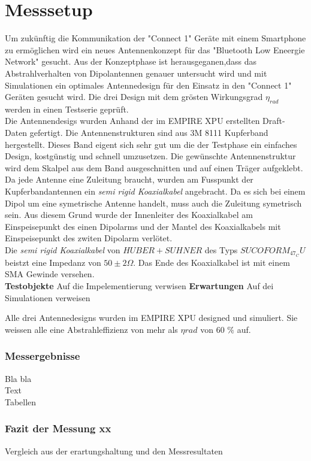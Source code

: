 \section{Messsetup}
Um zukünftig die Kommunikation der "Connect 1" Geräte mit einem Smartphone zu ermöglichen wird ein neues Antennenkonzept für das "Bluetooth Low Eneergie Network" gesucht. Aus der Konzeptphase ist herausgeganen,dass das Abstrahlverhalten von Dipolantennen genauer untersucht wird und mit Simulationen ein optimales Antennedesign für den Einsatz in den "Connect 1" Geräten gesucht wird. Die drei Design mit dem grösten Wirkungsgrad $\eta_{rad}$ werden in einen Testserie geprüft.\\
Die Antennendesigs wurden Anhand der im EMPIRE XPU erstellten Draft-Daten gefertigt. Die Antennenstrukturen sind aus 3M 8111 Kupferband hergestellt. Dieses Band eigent sich sehr gut um die der Testphase ein einfaches Design, kostgünstig und schnell umzusetzen. Die gewünschte Antennenstruktur wird dem Skalpel aus dem Band ausgeschnitten und auf einen Träger aufgeklebt. \\
Da jede Antenne eine Zuleitung braucht, wurden am Fusspunkt der Kupferbandantennen ein \textit{semi rigid Koaxialkabel} angebracht. Da es sich bei einem Dipol um eine symetrische Antenne handelt, muss auch die Zuleitung symetrisch sein. Aus diesem Grund wurde der Innenleiter des Koaxialkabel am Einspeisepunkt des einen Dipolarms und der Mantel des Koaxialkabels mit Einspeisepunkt des zwiten Dipolarm verlötet.\\
Die \textit{semi rigid Koaxialkabel} von $HUBER+SUHNER$ des Typs $SUCOFORM_47_CU$ beistzt eine Impedanz von $50  \pm 2\Omega$. Das Ende des Koaxialkabel ist mit einem SMA Gewinde versehen.\\

\textbf{Testobjekte}
Auf die Impelementierung verwisen
\textbf{Erwartungen}
Auf dei Simulationen verweisen

Alle drei Antennedesigns wurden im EMPIRE XPU designed und simuliert. Sie weissen alle eine Abstrahleffizienz von mehr als $\eta{rad}$ von 60 $\%$ auf. 
\subsubsection{Messergebnisse}
Bla bla\\
Text\\
Tabellen\\
\subsubsection{Fazit der Messung xx}
Vergleich aus der erartungshaltung und den Messresultaten